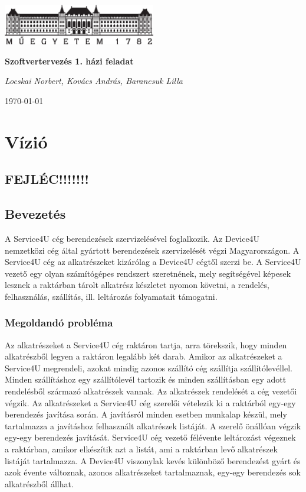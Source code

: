 \documentclass[11pt]{article}\usepackage[left=20mm,right=20mm,top=15mm,bottom=20mm]{geometry}
\begin{document}
\begin{titlepage}
\centering
	\includegraphics[width=0.5\textwidth]{figures/bme_logo_kicsi.eps}\par\vspace{1cm}
	\vspace{1cm}
	\vspace{1.5cm}
	{\huge\bfseries Szoftvertervezés 1. házi feladat \par}
	\vspace{15cm}
	{\huge\itshape Locskai Norbert, Kovács András, Barancsuk Lilla \par}
	\vfill

	{\large \today\par}
\end{titlepage}

\section{Vízió}
\subsection{FEJLÉC!!!!!!!}

\subsection{Bevezetés}
A Service4U cég berendezések szervizelésével foglalkozik. Az Device4U nemzetközi cég által
gyártott berendezések szervizelését végzi Magyarországon. A Service4U cég az alkatrészeket
kizárólag a Device4U cégtől szerzi be.
A Service4U vezető egy olyan számítógépes rendszert szeretnének, mely segítségével képesek
lesznek a raktárban tárolt alkatrész készletet nyomon követni, a rendelés, felhasználás, szállítás, ill.
leltározás folyamatait támogatni.

\subsubsection{Megoldandó probléma}
Az alkatrészeket a Service4U cég raktáron tartja, arra törekszik, hogy minden alkatrészből legyen a
raktáron legalább két darab. Amikor az alkatrészeket a Service4U megrendeli, azokat mindig
azonos szállító cég szállítja szállítólevéllel. Minden szállításhoz egy szállítólevél tartozik és minden
szállításban egy adott rendelésből származó alkatrészek vannak. Az alkatrészek rendelését a cég
vezetői végzik.
Az alkatrészeket a Service4U cég szerelői vételezik ki a raktárból egy-egy berendezés javítása
során. A javításról minden esetben munkalap készül, mely tartalmazza a javításhoz felhasznált
alkatrészek listáját. A szerelő önállóan végzik egy-egy berendezés javítását.
Service4U cég vezető félévente leltározást végeznek a raktárban, amikor elkészítik azt a listát, ami a
raktárban levő alkatrészek listáját tartalmazza.
A Device4U viszonylak kevés különböző berendezést gyárt és azok évente változnak, azonos
alkatrészeket tartalmaznak, egy-egy berendezés sok alkatrészből állhat.
\end{document}

